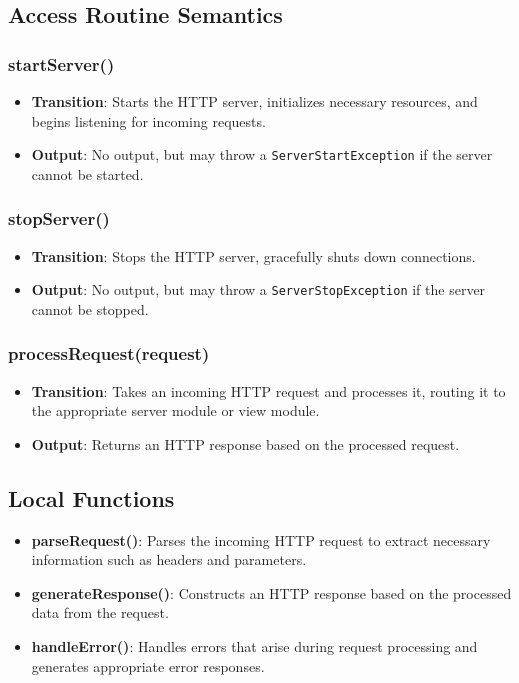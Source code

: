 \documentclass[12pt, titlepage]{article}
\begin{document}
\subsection{Access Routine Semantics}
\subsubsection{startServer()}
\begin{itemize}
    \item \textbf{Transition}: Starts the HTTP server, initializes necessary resources, and begins listening for incoming requests.
    \item \textbf{Output}: No output, but may throw a \texttt{ServerStartException} if the server cannot be started.
\end{itemize}

\subsubsection{stopServer()}
\begin{itemize}
    \item \textbf{Transition}: Stops the HTTP server, gracefully shuts down connections.
    \item \textbf{Output}: No output, but may throw a \texttt{ServerStopException} if the server cannot be stopped.
\end{itemize}

\subsubsection{processRequest(request)}
\begin{itemize}
    \item \textbf{Transition}: Takes an incoming HTTP request and processes it, routing it to the appropriate server module or view module.
    \item \textbf{Output}: Returns an HTTP response based on the processed request.
\end{itemize}

\subsection{Local Functions}
\begin{itemize}
    \item \textbf{parseRequest()}: Parses the incoming HTTP request to extract necessary information such as headers and parameters.
    \item \textbf{generateResponse()}: Constructs an HTTP response based on the processed data from the request.
    \item \textbf{handleError()}: Handles errors that arise during request processing and generates appropriate error responses.
\end{itemize}
\end{document}
